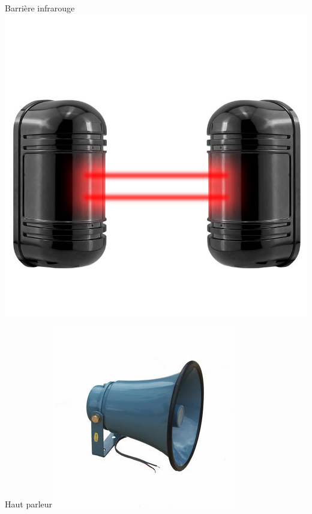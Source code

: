 \begin{UPSTIactivite}
\begin{minipage}[b]{0.24\textwidth}

\end{minipage}
\begin{minipage}[b]{0.24\textwidth}
\centering
  Barrière infrarouge
  \includegraphics[width=\textwidth,height=.15\textheight,keepaspectratio]{images/barriereInfrarouge}


\end{minipage}
\begin{minipage}[b]{0.24\textwidth}
\centering
  Haut parleur
  \includegraphics[width=\textwidth,height=.15\textheight,keepaspectratio]{images/hautParleur}


\end{minipage}
\end{UPSTIactivite}
